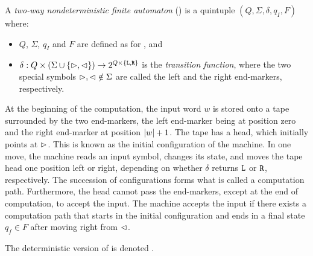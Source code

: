 \begin{defn}
	A \emph{two-way nondeterministic finite automaton} (\TNFA) is a quintuple $(Q,\Sigma,\delta,q_I,F)$ where:
	\begin{itemize}
		\item $Q$, $\Sigma$, $q_I$ and $F$ are defined as for \ONFAs, and
		\item $\delta:Q\times(\Sigma\cup\{\rhd,\lhd\})\to2^{Q\times\{\mathtt L,\mathtt R\}}$ is the \emph{transition function}, where the two special symbols $\rhd,\lhd\notin\Sigma$ are called the left and the right end-markers, respectively.
	\end{itemize}
	At the beginning of the computation, the input word $w$ is stored onto a tape surrounded by the two end-markers, the left end-marker being at position zero and the right end-marker at position $\lvert w \rvert+1$.
	The tape has a head, which initially points at $\rhd$.
	This is known as the initial configuration of the machine.
	In one move, the machine reads an input symbol, changes its state, and moves the tape head one position left or right, depending on whether $\delta$ returns $\mathtt L$ or $\mathtt R$, respectively.
	The succession of configurations forms what is called a computation path.
	Furthermore, the head cannot pass the end-markers, except at the end of computation, to accept the input.
	The machine accepts the input if there exists a computation path that starts in the initial configuration and ends in a final state $q_f\in F$ after moving right from $\lhd$.

	The deterministic version of \TNFA is denoted \TDFA.
\end{defn}





